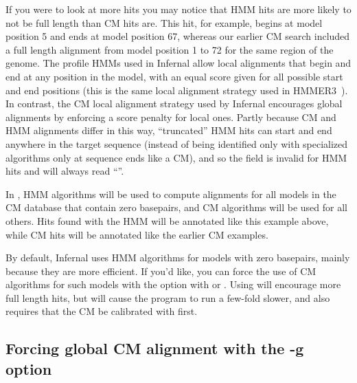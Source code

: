 If you were to look at more hits you may notice that HMM hits are
more likely to not be full length than CM hits are. This hit, for
example, begins at model position 5 and ends at model position 67,
whereas our earlier CM search included a full length alignment from
model position 1 to 72 for the same region of the genome. The profile
HMMs used in Infernal allow local alignments that begin and end at any
position in the model, with an equal score given for all possible
start and end positions (this is the same local alignment strategy
used in HMMER3~\citep{Eddy08}). In contrast, the CM local alignment
strategy used by Infernal encourages global alignments by enforcing a
score penalty for local ones. Partly because CM and HMM alignments
differ in this way, ``truncated'' HMM hits can start and end anywhere
in the target sequence (instead of being identified only with
specialized algorithms only at sequence ends like a CM), and so the
 field is invalid for HMM hits and will always read
``\otext{-}''.

In , HMM algorithms will be used to compute alignments
for all models in the CM database that contain zero basepairs, and CM
algorithms will be used for all others. Hits found with the HMM will
be annotated like this example above, while CM hits will be annotated
like the earlier CM examples.

By default, Infernal uses HMM algorithms for models with zero
basepairs, mainly because they are more efficient. If you'd like, you
can force the use of CM algorithms for such models with the
 option with  or . Using
 will encourage more full length hits, but will
cause the program to run a few-fold slower, and also requires that the
CM be calibrated with  first.

\subsection{Forcing global CM alignment with the -g option}

